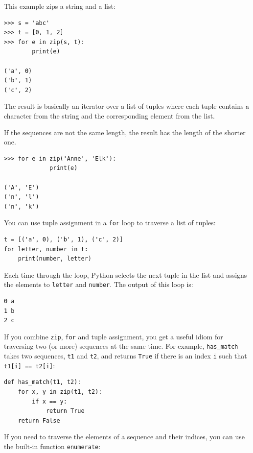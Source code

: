 \documentclass[10pt]{book}
\begin{document}

This example zips a string and a list:

\beforeverb
\begin{verbatim}
>>> s = 'abc'
>>> t = [0, 1, 2]
>>> for e in zip(s, t):
	    print(e)
	    
('a', 0)
('b', 1)
('c', 2)
\end{verbatim}
\afterverb
%
The result is basically an iterator over a list of tuples where each tuple contains
a character from the string and the corresponding element from
the list.


If the sequences are not the same length, the result has the
length of the shorter one.

\beforeverb
\begin{verbatim}
>>> for e in zip('Anne', 'Elk'):
             print(e)
             
('A', 'E')
('n', 'l')
('n', 'k')
\end{verbatim}
\afterverb
%
You can use tuple assignment in a {\tt for} loop to traverse a list of
tuples:


\beforeverb
\begin{verbatim}
t = [('a', 0), ('b', 1), ('c', 2)]
for letter, number in t:
    print(number, letter)
\end{verbatim}
\afterverb
%
Each time through the loop, Python selects the next tuple in
the list and assigns the elements to {\tt letter} and 
{\tt number}.  The output of this loop is:


\beforeverb
\begin{verbatim}
0 a
1 b
2 c
\end{verbatim}
\afterverb
%
If you combine {\tt zip}, {\tt for} and tuple assignment, you get a
useful idiom for traversing two (or more) sequences at the same
time.  For example, \verb"has_match" takes two sequences, {\tt t1} and
{\tt t2}, and returns {\tt True} if there is an index {\tt i}
such that {\tt t1[i] == t2[i]}:


\beforeverb
\begin{verbatim}
def has_match(t1, t2):
    for x, y in zip(t1, t2):
        if x == y:
            return True
    return False
\end{verbatim}
\afterverb
%
If you need to traverse the elements of a sequence and their
indices, you can use the built-in function {\tt enumerate}:
\end{document}
